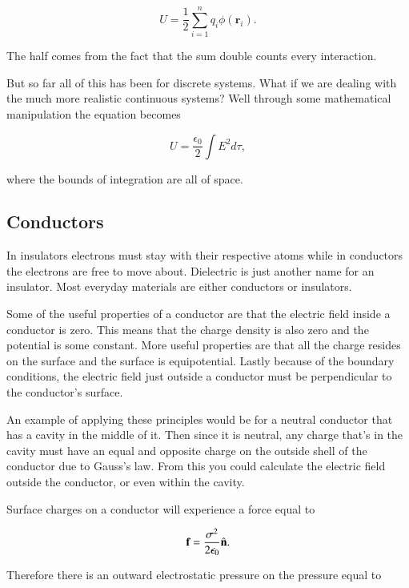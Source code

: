 \documentclass[preprint, review,12pt]{elsarticle}
\def\b{\textbf}
\begin{document}
\begin{equation}
    U = \frac{1}{2}\sum_{i=1}^n q_i \phi(\b{r}_i).
\end{equation}

The half comes from the fact that the sum double counts every interaction.

But so far all of this has been for discrete systems. What if we are dealing with the much more realistic continuous systems? Well through some mathematical manipulation the equation becomes 

\begin{equation}
    U = \frac{\epsilon_0}{2}\int E^2 d\tau, 
\end{equation}

where the bounds of integration are all of space.

\subsection{Conductors}

In insulators electrons must stay with their respective atoms while in conductors the electrons are free to move about. Dielectric is just another name for an insulator. Most everyday materials are either conductors or insulators. 

Some of the useful properties of a conductor are that the electric field inside a conductor is zero. This means that the charge density is also zero and the potential is some constant. More useful properties are that all the charge resides on the surface and the surface is equipotential. Lastly because of the boundary conditions, the electric field just outside a conductor must be perpendicular to the conductor's surface. 

An example of applying these principles would be for a neutral conductor that has a cavity in the middle of it. Then since it is neutral, any charge that's in the cavity must have an equal and opposite charge on the outside shell of the conductor due to Gauss's law. From this you could calculate the electric field outside the conductor, or even within the cavity.

Surface charges on a conductor will experience a force equal to 

\begin{equation}
    \b{f} = \frac{\sigma^2}{2 \epsilon_0} \hat{\b n}.
\end{equation}

Therefore there is an outward electrostatic pressure on the pressure equal to
\end{document}
